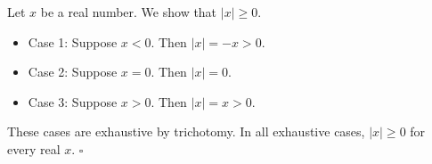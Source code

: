 Let $x$ be a real number.
We show that $\lvert x \rvert \geq 0$.

\begin{itemize}
  \item Case 1: Suppose $x < 0$.
    Then $\lvert x \rvert = -x > 0$.
  \item Case 2: Suppose $x = 0$.
    Then $\lvert x \rvert = 0$.
  \item Case 3: Suppose $x > 0$.
    Then $\lvert x \rvert = x > 0$.
\end{itemize}

These cases are exhaustive by trichotomy.
In all exhaustive cases, $\lvert x \rvert \geq 0$ for every real $x$. \hfill$\square$